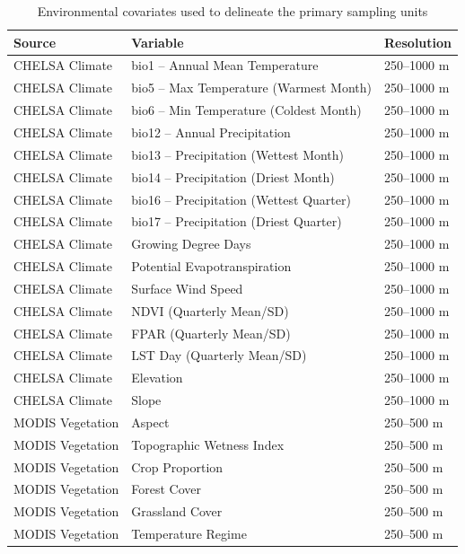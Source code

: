 \documentclass[
  10pt,
  b5paper,
  oneside]{book}
\begin{document}
\begin{table}

\caption{\label{tab:psu-covariates}Environmental covariates used to delineate the primary sampling units}
\centering
\begin{tabular}[t]{l|l|l}
\hline
Source & Variable & Resolution\\
\hline
CHELSA Climate & bio1 – Annual Mean Temperature & 250–1000 m\\
\hline
CHELSA Climate & bio5 – Max Temperature (Warmest Month) & 250–1000 m\\
\hline
CHELSA Climate & bio6 – Min Temperature (Coldest Month) & 250–1000 m\\
\hline
CHELSA Climate & bio12 – Annual Precipitation & 250–1000 m\\
\hline
CHELSA Climate & bio13 – Precipitation (Wettest Month) & 250–1000 m\\
\hline
CHELSA Climate & bio14 – Precipitation (Driest Month) & 250–1000 m\\
\hline
CHELSA Climate & bio16 – Precipitation (Wettest Quarter) & 250–1000 m\\
\hline
CHELSA Climate & bio17 – Precipitation (Driest Quarter) & 250–1000 m\\
\hline
CHELSA Climate & Growing Degree Days & 250–1000 m\\
\hline
CHELSA Climate & Potential Evapotranspiration & 250–1000 m\\
\hline
CHELSA Climate & Surface Wind Speed & 250–1000 m\\
\hline
CHELSA Climate & NDVI (Quarterly Mean/SD) & 250–1000 m\\
\hline
CHELSA Climate & FPAR (Quarterly Mean/SD) & 250–1000 m\\
\hline
CHELSA Climate & LST Day (Quarterly Mean/SD) & 250–1000 m\\
\hline
CHELSA Climate & Elevation & 250–1000 m\\
\hline
CHELSA Climate & Slope & 250–1000 m\\
\hline
MODIS Vegetation & Aspect & 250–500 m\\
\hline
MODIS Vegetation & Topographic Wetness Index & 250–500 m\\
\hline
MODIS Vegetation & Crop Proportion & 250–500 m\\
\hline
MODIS Vegetation & Forest Cover & 250–500 m\\
\hline
MODIS Vegetation & Grassland Cover & 250–500 m\\
\hline
MODIS Vegetation & Temperature Regime & 250–500 m\\

\end{tabular}
\end{table}
\end{document}
